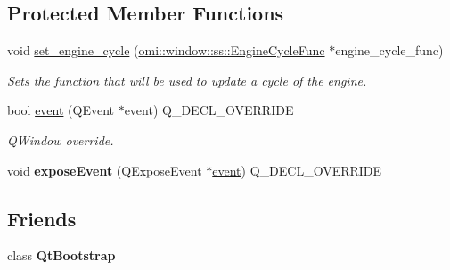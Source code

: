 \subsection*{Protected Member Functions}
\begin{DoxyCompactItemize}
\item 
void \hyperlink{classomi__qt_1_1_qt_main_window_a810a2abc13abe07839b54d9fdafb6ec5}{set\+\_\+engine\+\_\+cycle} (\hyperlink{namespaceomi_1_1window_1_1ss_af42d2464a170bdfd876a35b9fde16137}{omi\+::window\+::ss\+::\+Engine\+Cycle\+Func} $\ast$engine\+\_\+cycle\+\_\+func)\hypertarget{classomi__qt_1_1_qt_main_window_a810a2abc13abe07839b54d9fdafb6ec5}{}\label{classomi__qt_1_1_qt_main_window_a810a2abc13abe07839b54d9fdafb6ec5}

\begin{DoxyCompactList}\small\item\em Sets the function that will be used to update a cycle of the engine. \end{DoxyCompactList}\item 
bool \hyperlink{classomi__qt_1_1_qt_main_window_a358ee23739c444018367a8e6431d7d32}{event} (Q\+Event $\ast$event) Q\+\_\+\+D\+E\+C\+L\+\_\+\+O\+V\+E\+R\+R\+I\+DE\hypertarget{classomi__qt_1_1_qt_main_window_a358ee23739c444018367a8e6431d7d32}{}\label{classomi__qt_1_1_qt_main_window_a358ee23739c444018367a8e6431d7d32}

\begin{DoxyCompactList}\small\item\em Q\+Window override. \end{DoxyCompactList}\item 
void {\bfseries expose\+Event} (Q\+Expose\+Event $\ast$\hyperlink{classomi__qt_1_1_qt_main_window_a358ee23739c444018367a8e6431d7d32}{event}) Q\+\_\+\+D\+E\+C\+L\+\_\+\+O\+V\+E\+R\+R\+I\+DE\hypertarget{classomi__qt_1_1_qt_main_window_a9c04fec74da84d899820b4bd3bb8444b}{}\label{classomi__qt_1_1_qt_main_window_a9c04fec74da84d899820b4bd3bb8444b}

\end{DoxyCompactItemize}
\subsection*{Friends}
\begin{DoxyCompactItemize}
\item 
class {\bfseries Qt\+Bootstrap}\hypertarget{classomi__qt_1_1_qt_main_window_aa2f28ab658b753d4bd0b8eb0ea289b2b}{}\label{classomi__qt_1_1_qt_main_window_aa2f28ab658b753d4bd0b8eb0ea289b2b}

\end{DoxyCompactItemize}


